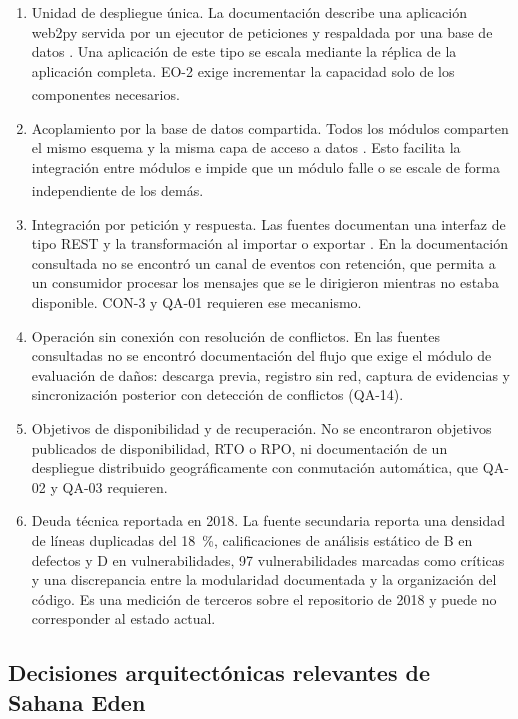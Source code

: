 \documentclass[11pt,letterpaper]{article}
\newcommand{\inferencia}{\textsuperscript{\textasteriskcentered}}
\begin{document}
\begin{enumerate}
  \item Unidad de despliegue única. La documentación describe una aplicación web2py servida por un
        ejecutor de peticiones y respaldada por una base de datos \cite{eden-basics}. Una aplicación
        de este tipo se escala mediante la réplica de la aplicación completa. EO-2 exige incrementar
        la capacidad solo de los componentes necesarios.\inferencia{}
  \item Acoplamiento por la base de datos compartida. Todos los módulos comparten el mismo esquema y
        la misma capa de acceso a datos \cite{eden-basics}. Esto facilita la integración entre
        módulos e impide que un módulo falle o se escale de forma independiente de los
        demás.\inferencia{}
  \item Integración por petición y respuesta. Las fuentes documentan una interfaz de tipo REST y la
        transformación al importar o exportar \cite{eden-xslt,desosa2018}. En la documentación
        consultada no se encontró un canal de eventos con retención, que permita a un consumidor
        procesar los mensajes que se le dirigieron mientras no estaba disponible. CON-3 y QA-01
        requieren ese mecanismo.
  \item Operación sin conexión con resolución de conflictos. En las fuentes consultadas no se
        encontró documentación del flujo que exige el módulo de evaluación de daños: descarga
        previa, registro sin red, captura de evidencias y sincronización posterior con detección de
        conflictos (QA-14).
  \item Objetivos de disponibilidad y de recuperación. No se encontraron objetivos publicados de
        disponibilidad, RTO o RPO, ni documentación de un despliegue distribuido geográficamente con
        conmutación automática, que QA-02 y QA-03 requieren.
  \item Deuda técnica reportada en 2018. La fuente secundaria \cite{desosa2018} reporta una densidad
        de líneas duplicadas del \qty{18}{\percent}, calificaciones de análisis estático de B en
        defectos y D en vulnerabilidades, 97 vulnerabilidades marcadas como críticas y una
        discrepancia entre la modularidad documentada y la organización del código. Es una medición
        de terceros sobre el repositorio de 2018 y puede no corresponder al estado actual.
\end{enumerate}

\subsection{Decisiones arquitectónicas relevantes de Sahana Eden}
\end{document}
